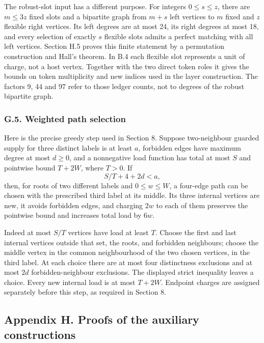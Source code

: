 \documentclass[english,11pt,a4paper]{article}
\begin{document}
The robust-slot input has a different purpose. For integers \(0\le s\le z\), there are \(m\le3z\) fixed slots and a bipartite graph from \(m+s\) left vertices to \(m\) fixed and \(z\) flexible right vertices. Its left degrees are at most 24, its right degrees at most 18, and every selection of exactly \(s\) flexible slots admits a perfect matching with all left vertices. Section H.5 proves this finite statement by a permutation construction and Hall's theorem. In B.4 each flexible slot represents a unit of charge, not a host vertex. Together with the two direct token roles it gives the bounds on token multiplicity and new indices used in the layer construction. The factors 9, 44 and 97 refer to those ledger counts, not to degrees of the robust bipartite graph.

\subsubsection{G.5. Weighted path selection}\label{g.5.-weighted-path-selection}

Here is the precise greedy step used in Section 8. Suppose two-neighbour guarded supply for three distinct labels is at least \(a\), forbidden edges have maximum degree at most \(d\ge0\), and a nonnegative load function has total at most \(S\) and pointwise bound \(T+2W\), where \(T>0\). If \[S/T+4+2d<a,\] then, for roots of two different labels and \(0\le w\le W\), a four-edge path can be chosen with the prescribed third label at its middle. Its three internal vertices are new, it avoids forbidden edges, and charging \(2w\) to each of them preserves the pointwise bound and increases total load by \(6w\).

Indeed at most \(S/T\) vertices have load at least \(T\). Choose the first and last internal vertices outside that set, the roots, and forbidden neighbours; choose the middle vertex in the common neighbourhood of the two chosen vertices, in the third label. At each choice there are at most four distinctness exclusions and at most \(2d\) forbidden-neighbour exclusions. The displayed strict inequality leaves a choice. Every new internal load is at most \(T+2W\). Endpoint charges are assigned separately before this step, as required in Section 8.

\clearpage

\subsection{Appendix H. Proofs of the auxiliary constructions}\label{appendix-h.-proofs-of-the-auxiliary-constructions}
\end{document}
